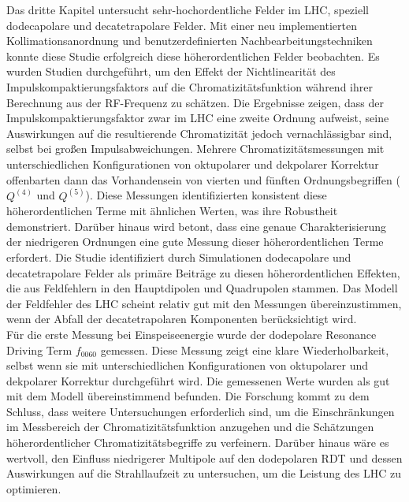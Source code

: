 {%
Das dritte Kapitel untersucht sehr-hochordentliche Felder im LHC, speziell dodecapolare und decatetrapolare Felder. Mit einer neu implementierten Kollimationsanordnung und benutzerdefinierten Nachbearbeitungstechniken konnte diese Studie erfolgreich diese höherordentlichen Felder beobachten. Es wurden Studien durchgeführt, um den Effekt der Nichtlinearität des Impulskompaktierungsfaktors auf die Chromatizitätsfunktion während ihrer Berechnung aus der RF-Frequenz zu schätzen. Die Ergebnisse zeigen, dass der Impulskompaktierungsfaktor zwar im LHC eine zweite Ordnung aufweist, seine Auswirkungen auf die resultierende Chromatizität jedoch vernachlässigbar sind, selbst bei großen Impulsabweichungen. Mehrere Chromatizitätsmessungen mit unterschiedlichen Konfigurationen von oktupolarer und dekpolarer Korrektur offenbarten dann das Vorhandensein von vierten und fünften Ordnungsbegriffen ($Q^{(4)}$ und $Q^{(5)}$). Diese Messungen identifizierten konsistent diese höherordentlichen Terme mit ähnlichen Werten, was ihre Robustheit demonstriert. Darüber hinaus wird betont, dass eine genaue Charakterisierung der niedrigeren Ordnungen eine gute Messung dieser höherordentlichen Terme erfordert. Die Studie identifiziert durch Simulationen dodecapolare und decatetrapolare Felder als primäre Beiträge zu diesen höherordentlichen Effekten, die aus Feldfehlern in den Hauptdipolen und Quadrupolen stammen. Das Modell der Feldfehler des LHC scheint relativ gut mit den Messungen übereinzustimmen, wenn der Abfall der decatetrapolaren Komponenten berücksichtigt wird.  
\\
\indent
Für die erste Messung bei Einspeiseenergie wurde der dodepolare Resonance Driving Term $f_{0060}$ gemessen. Diese Messung zeigt eine klare Wiederholbarkeit, selbst wenn sie mit unterschiedlichen Konfigurationen von oktupolarer und dekpolarer Korrektur durchgeführt wird. Die gemessenen Werte wurden als gut mit dem Modell übereinstimmend befunden. Die Forschung kommt zu dem Schluss, dass weitere Untersuchungen erforderlich sind, um die Einschränkungen im Messbereich der Chromatizitätsfunktion anzugehen und die Schätzungen höherordentlicher Chromatizitätsbegriffe zu verfeinern. Darüber hinaus wäre es wertvoll, den Einfluss niedrigerer Multipole auf den dodepolaren RDT und dessen Auswirkungen auf die Strahllaufzeit zu untersuchen, um die Leistung des LHC zu optimieren.

}
